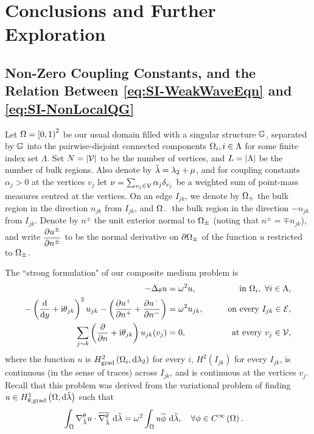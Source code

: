 \section{Conclusions and Further Exploration} \label{sec:SI-Conc}

\subsection{Non-Zero Coupling Constants, and the Relation Between \eqref{eq:SI-WeakWaveEqn} and \eqref{eq:SI-NonLocalQG}} \label{ssec:SI-Strauss}

Let $\Omega=\left[0,1\right)^2$ be our usual domain filled with a singular structure $\mathbb{G}$, separated by $\mathbb{G}$ into the pairwise-disjoint connected components $\Omega_i, i\in\Lambda$ for some finite index set $\Lambda$.
Set $N = \left\lvert \mathcal{V} \right\rvert$ to be the number of vertices, and $L=\left\lvert \Lambda \right\rvert$ be the number of bulk regions.
Also denote by $\tilde{\lambda} = \lambda_2 + \mu$, and for coupling constants $\alpha_j>0$ at the vertices $v_j$ let $\nu = \sum_{v_j\in\mathcal{V}}\alpha_j\delta_{v_j}$ be a weighted sum of point-mass measures centred at the vertices.
On an edge $I_{jk}$, we denote by $\Omega_+$ the bulk region in the direction $n_{jk}$ from $I_{jk}$, and $\Omega_-$ the bulk region in the direction $-n_{jk}$ from $I_{jk}$.
Denote by $n^{\pm}$ the unit exterior normal to $\Omega_{\pm}$ (noting that $n^{\pm}=\mp n_{jk}$), and write $\dfrac{\partial u^{\pm}}{\partial n^{\pm}}$ to be the normal derivative on $\partial\Omega_{\pm}$ of the function $u$ restricted to $\Omega_{\pm}$.

The ``strong formulation" of our composite medium problem is
\begin{subequations} \label{eq:StrongForm}
	\begin{align}
		-\Delta_{\theta}u &= \omega^2 u, &\qquad\text{in } \Omega_i, \ \forall i\in\Lambda, \\
		-\left( \dfrac{\mathrm{d}}{\mathrm{d}y}+\mathrm{i}\theta_{jk} \right)^2 u_{jk} - \left( \dfrac{\partial u^+}{\partial n^+} + \dfrac{\partial u^-}{\partial n^-} \right) &= \omega^2 u_{jk},  &\qquad\text{on every } I_{jk}\in\mathcal{E}, \\
		\sum_{j\sim k}\left( \dfrac{\partial }{\partial n}+\mathrm{i}\theta_{jk} \right)u_{jk}(v_j) &= 0, &\qquad\text{at every } v_j\in\mathcal{V},
	\end{align}
\end{subequations}
where the function $u$ is $H^2_\mathrm{grad}\left( \Omega_i, \mathrm{d}\lambda_2 \right)$ for every $i$, $H^2(I_{jk})$ for every $I_{jk}$, is continuous (in the sense of traces) across $I_{jk}$, and is continuous at the vertices $v_j$.
Recall that this problem was derived from the variational problem of finding $u\in H^1_{\theta, \mathrm{grad}}\left( \Omega, \mathrm{d}\tilde{\lambda} \right)$ such that
\begin{align} \label{eq:WeakForm}
	\int_{\Omega} \nabla^{\theta}_{\tilde{\lambda}}u\cdot\overline{\nabla^{\theta}_{\tilde{\lambda}}}  \ \mathrm{d}\tilde{\lambda} &=
	\omega^2\int_{\Omega} u\overline{\phi}  \ \mathrm{d}\tilde{\lambda}, \quad\forall\phi\in C^{\infty}\left( \Omega \right).
\end{align}

